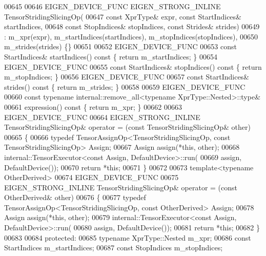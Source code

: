 \begin{DoxyCode}
00645 
00646   EIGEN\_DEVICE\_FUNC EIGEN\_STRONG\_INLINE TensorStridingSlicingOp(
00647     \textcolor{keyword}{const} XprType& expr, \textcolor{keyword}{const} StartIndices& startIndices,
00648     \textcolor{keyword}{const} StopIndices& stopIndices, \textcolor{keyword}{const} Strides& strides)
00649       : m\_xpr(expr), m\_startIndices(startIndices), m\_stopIndices(stopIndices),
00650         m\_strides(strides) \{\}
00651 
00652     EIGEN\_DEVICE\_FUNC
00653     \textcolor{keyword}{const} StartIndices& startIndices()\textcolor{keyword}{ const }\{ \textcolor{keywordflow}{return} m\_startIndices; \}
00654     EIGEN\_DEVICE\_FUNC
00655     \textcolor{keyword}{const} StartIndices& stopIndices()\textcolor{keyword}{ const }\{ \textcolor{keywordflow}{return} m\_stopIndices; \}
00656     EIGEN\_DEVICE\_FUNC
00657     \textcolor{keyword}{const} StartIndices& strides()\textcolor{keyword}{ const }\{ \textcolor{keywordflow}{return} m\_strides; \}
00658 
00659     EIGEN\_DEVICE\_FUNC
00660     \textcolor{keyword}{const} \textcolor{keyword}{typename} internal::remove\_all<typename XprType::Nested>::type&
00661     expression()\textcolor{keyword}{ const }\{ \textcolor{keywordflow}{return} m\_xpr; \}
00662 
00663     EIGEN\_DEVICE\_FUNC
00664     EIGEN\_STRONG\_INLINE TensorStridingSlicingOp& operator = (\textcolor{keyword}{const} TensorStridingSlicingOp& other)
00665     \{
00666       \textcolor{keyword}{typedef} TensorAssignOp<TensorStridingSlicingOp, const TensorStridingSlicingOp> Assign;
00667       Assign assign(*\textcolor{keyword}{this}, other);
00668       internal::TensorExecutor<const Assign, DefaultDevice>::run(
00669           assign, DefaultDevice());
00670       \textcolor{keywordflow}{return} *\textcolor{keyword}{this};
00671     \}
00672 
00673     \textcolor{keyword}{template}<\textcolor{keyword}{typename} OtherDerived>
00674     EIGEN\_DEVICE\_FUNC
00675     EIGEN\_STRONG\_INLINE TensorStridingSlicingOp& operator = (\textcolor{keyword}{const} OtherDerived& other)
00676     \{
00677       \textcolor{keyword}{typedef} TensorAssignOp<TensorStridingSlicingOp, const OtherDerived> Assign;
00678       Assign assign(*\textcolor{keyword}{this}, other);
00679       internal::TensorExecutor<const Assign, DefaultDevice>::run(
00680           assign, DefaultDevice());
00681       \textcolor{keywordflow}{return} *\textcolor{keyword}{this};
00682     \}
00683 
00684   \textcolor{keyword}{protected}:
00685     \textcolor{keyword}{typename} XprType::Nested m\_xpr;
00686     \textcolor{keyword}{const} StartIndices m\_startIndices;
00687     \textcolor{keyword}{const} StopIndices m\_stopIndices;

\end{DoxyCode}
